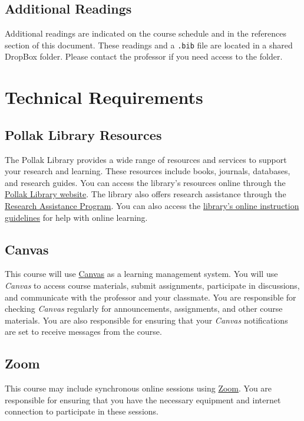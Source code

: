 \documentclass[11pt, letterpaper]{article}
\begin{document}
\subsection*{Additional Readings}

\noindent Additional readings are indicated on the course schedule and in the references section of this document. These readings and a \texttt{.bib} file are located in a shared DropBox folder. Please contact the professor if you need access to the folder.

\section{Technical Requirements}

\subsection*{Pollak Library Resources}

The Pollak Library provides a wide range of resources and services to support your research and learning. These resources include books, journals, databases, and research guides. You can access the library's resources online through the \href{http://www.library.fullerton.edu/}{Pollak Library website}. The library also offers research assistance through the \href{http://www.library.fullerton.edu/research/}{Research Assistance Program}. You can also access the \href{http://www.library.fullerton.edu/about/guidelines/online-instruction-guidelines.php}{library's online instruction guidelines} for help with online learning.

\subsection*{Canvas}

This course will use \href{https://csufullerton.instructure.com/}{Canvas} as a learning management system. You will use \emph{Canvas} to access course materials, submit assignments, participate in discussions, and communicate with the professor and your classmate. You are responsible for checking \emph{Canvas} regularly for announcements, assignments, and other course materials. You are also responsible for ensuring that your \emph{Canvas} notifications are set to receive messages from the course. 

\subsection*{Zoom}
This course may include synchronous online sessions using \href{https://fullerton.zoom.us/}{Zoom}. You are responsible for ensuring that you have the necessary equipment and internet connection to participate in these sessions. 
\end{document}

